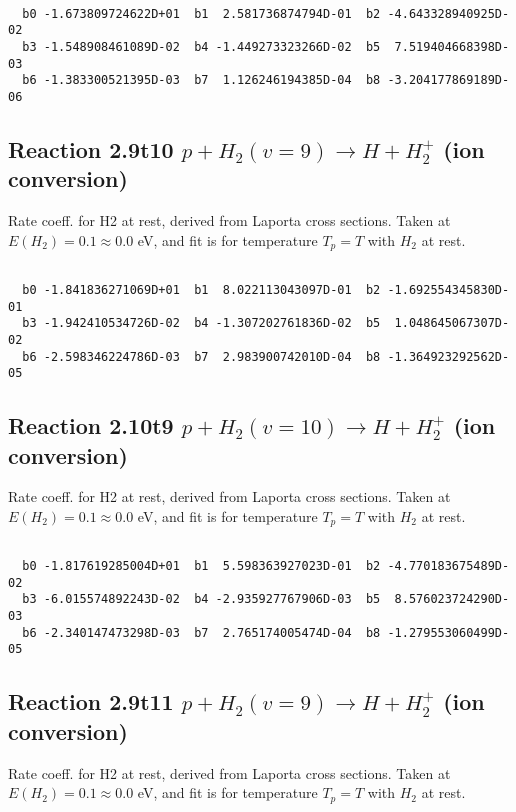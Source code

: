 \begin{small}\begin{verbatim}

  b0 -1.673809724622D+01  b1  2.581736874794D-01  b2 -4.643328940925D-02
  b3 -1.548908461089D-02  b4 -1.449273323266D-02  b5  7.519404668398D-03
  b6 -1.383300521395D-03  b7  1.126246194385D-04  b8 -3.204177869189D-06

\end{verbatim}\end{small}

\newpage
\subsection{
Reaction 2.9t10
$ p + H_2(v=9) \rightarrow H + H_2^+$ (ion conversion)
}
Rate coeff. for H2 at rest, derived from Laporta cross sections.
Taken at $E(H_2) = 0.1 \approx 0.0$ eV,  and fit is for temperature $T_p=T$ with $H_2$ at rest.

\begin{small}\begin{verbatim}

  b0 -1.841836271069D+01  b1  8.022113043097D-01  b2 -1.692554345830D-01
  b3 -1.942410534726D-02  b4 -1.307202761836D-02  b5  1.048645067307D-02
  b6 -2.598346224786D-03  b7  2.983900742010D-04  b8 -1.364923292562D-05

\end{verbatim}\end{small}

\newpage
\subsection{
Reaction 2.10t9
$ p + H_2(v=10) \rightarrow H + H_2^+$ (ion conversion)
}
Rate coeff. for H2 at rest, derived from Laporta cross sections.
Taken at $E(H_2) = 0.1 \approx 0.0$ eV,  and fit is for temperature $T_p=T$ with $H_2$ at rest.

\begin{small}\begin{verbatim}

  b0 -1.817619285004D+01  b1  5.598363927023D-01  b2 -4.770183675489D-02
  b3 -6.015574892243D-02  b4 -2.935927767906D-03  b5  8.576023724290D-03
  b6 -2.340147473298D-03  b7  2.765174005474D-04  b8 -1.279553060499D-05

\end{verbatim}\end{small}

\newpage
\subsection{
Reaction 2.9t11
$ p + H_2(v=9) \rightarrow H + H_2^+$ (ion conversion)
}
Rate coeff. for H2 at rest, derived from Laporta cross sections.
Taken at $E(H_2) = 0.1 \approx 0.0$ eV,  and fit is for temperature $T_p=T$ with $H_2$ at rest.

